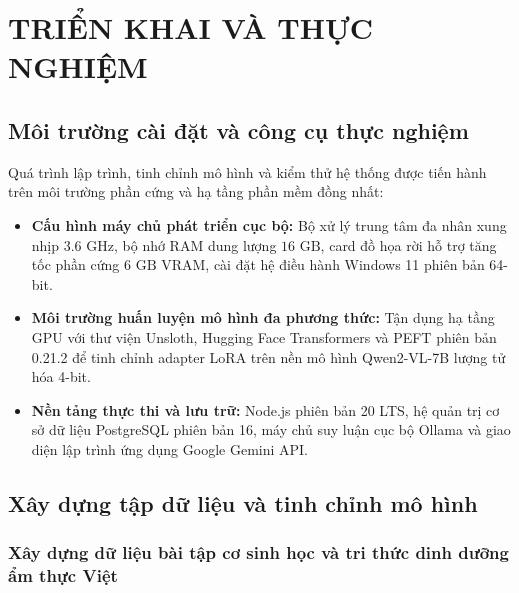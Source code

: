 
\chapter{TRIỂN KHAI VÀ THỰC NGHIỆM}
\label{chap:trienkhai}

\section{Môi trường cài đặt và công cụ thực nghiệm}
\label{sec:moitruong}

Quá trình lập trình, tinh chỉnh mô hình và kiểm thử hệ thống được tiến hành trên môi trường phần cứng và hạ tầng phần mềm đồng nhất:
\begin{itemize}[leftmargin=1.5cm]
    \item \textbf{Cấu hình máy chủ phát triển cục bộ:} Bộ xử lý trung tâm đa nhân xung nhịp $3.6\text{ GHz}$, bộ nhớ RAM dung lượng $16\text{ GB}$, card đồ họa rời hỗ trợ tăng tốc phần cứng $6\text{ GB}$ VRAM, cài đặt hệ điều hành Windows 11 phiên bản 64-bit.
    \item \textbf{Môi trường huấn luyện mô hình đa phương thức:} Tận dụng hạ tầng GPU với thư viện Unsloth, Hugging Face Transformers và PEFT phiên bản 0.21.2 để tinh chỉnh adapter LoRA trên nền mô hình Qwen2-VL-7B lượng tử hóa 4-bit.
    \item \textbf{Nền tảng thực thi và lưu trữ:} Node.js phiên bản 20 LTS, hệ quản trị cơ sở dữ liệu PostgreSQL phiên bản 16, máy chủ suy luận cục bộ Ollama và giao diện lập trình ứng dụng Google Gemini API.
\end{itemize}

\section{Xây dựng tập dữ liệu và tinh chỉnh mô hình}
\label{sec:huanluyen}

\subsection{Xây dựng dữ liệu bài tập cơ sinh học và tri thức dinh dưỡng ẩm thực Việt}
\label{subsec:chuanbi_dulieu}

